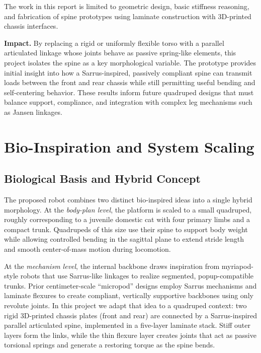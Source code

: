 \documentclass[11pt,letterpaper]{article}
\begin{document}
The work in this report is limited to geometric design, basic stiffness
reasoning, and fabrication of spine prototypes using laminate construction with
3D-printed chassis interfaces.

\textbf{Impact.}  
By replacing a rigid or uniformly flexible torso with a parallel articulated
linkage whose joints behave as passive spring-like elements, this project
isolates the spine as a key morphological variable. The prototype provides
initial insight into how a Sarrus-inspired, passively compliant spine can
transmit loads between the front and rear chassis while still permitting
useful bending and self-centering behavior. These results inform future
quadruped designs that must balance support, compliance, and integration with
complex leg mechanisms such as Jansen linkages.

\section{Bio-Inspiration and System Scaling}
\label{sec:bio_inspiration}

\subsection{Biological Basis and Hybrid Concept}

The proposed robot combines two distinct bio-inspired ideas into a single
hybrid morphology. At the \emph{body-plan level}, the platform is scaled to a
small quadruped, roughly corresponding to a juvenile domestic cat with four
primary limbs and a compact trunk. Quadrupeds of this size use their spine to
support body weight while allowing controlled bending in the sagittal plane to
extend stride length and smooth center-of-mass motion during locomotion.

At the \emph{mechanism level}, the internal backbone draws inspiration from
myriapod-style robots that use Sarrus-like linkages to realize segmented,
popup-compatible trunks. Prior centimeter-scale ``micropod'' designs employ
Sarrus mechanisms and laminate flexures to create compliant, vertically
supportive backbones using only revolute joints. In this project we adapt that
idea to a quadruped context: two rigid 3D-printed chassis plates (front and
rear) are connected by a Sarrus-inspired parallel articulated spine,
implemented in a five-layer laminate stack. Stiff outer layers form the links,
while the thin flexure layer creates joints that act as passive torsional
springs and generate a restoring torque as the spine bends.
\end{document}
